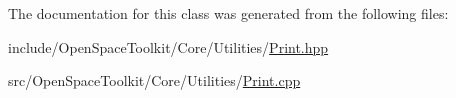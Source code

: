 The documentation for this class was generated from the following files\+:\begin{DoxyCompactItemize}
\item 
include/\+Open\+Space\+Toolkit/\+Core/\+Utilities/\hyperlink{_print_8hpp}{Print.\+hpp}\item 
src/\+Open\+Space\+Toolkit/\+Core/\+Utilities/\hyperlink{_print_8cpp}{Print.\+cpp}\end{DoxyCompactItemize}
